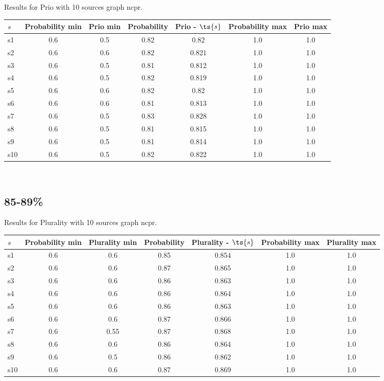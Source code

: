 \documentclass{article}
\begin{document}
\noindent Results for Prio with 10 sources graph ncpr.

\noindent\begin{tabular}{|l|c|c|c|c|c|c|}
\hline
$s$& Probability min & Prio min & Probability & Prio - $\ts{s}$ & Probability max & Prio max\\
\hline
s1 &0.6 & 0.5 & 0.82 & 0.82 & 1.0 & 1.0\\
\hline
s2 &0.6 & 0.6 & 0.82 & 0.821 & 1.0 & 1.0\\
\hline
s3 &0.6 & 0.5 & 0.81 & 0.812 & 1.0 & 1.0\\
\hline
s4 &0.6 & 0.5 & 0.82 & 0.819 & 1.0 & 1.0\\
\hline
s5 &0.6 & 0.6 & 0.82 & 0.82 & 1.0 & 1.0\\
\hline
s6 &0.6 & 0.6 & 0.81 & 0.813 & 1.0 & 1.0\\
\hline
s7 &0.6 & 0.5 & 0.83 & 0.828 & 1.0 & 1.0\\
\hline
s8 &0.6 & 0.5 & 0.81 & 0.815 & 1.0 & 1.0\\
\hline
s9 &0.6 & 0.5 & 0.81 & 0.814 & 1.0 & 1.0\\
\hline
s10 &0.6 & 0.5 & 0.82 & 0.822 & 1.0 & 1.0\\
\hline
\end{tabular}\\

\newpage

\subsection{85-89\%}

\noindent Results for Plurality with 10 sources graph ncpr.

\noindent\begin{tabular}{|l|c|c|c|c|c|c|}
\hline
$s$& Probability min & Plurality min & Probability & Plurality - $\ts{s}$ & Probability max & Plurality max\\
\hline
s1 &0.6 & 0.6 & 0.85 & 0.854 & 1.0 & 1.0\\
\hline
s2 &0.6 & 0.6 & 0.87 & 0.865 & 1.0 & 1.0\\
\hline
s3 &0.6 & 0.6 & 0.86 & 0.863 & 1.0 & 1.0\\
\hline
s4 &0.6 & 0.6 & 0.86 & 0.864 & 1.0 & 1.0\\
\hline
s5 &0.6 & 0.6 & 0.86 & 0.863 & 1.0 & 1.0\\
\hline
s6 &0.6 & 0.6 & 0.87 & 0.866 & 1.0 & 1.0\\
\hline
s7 &0.6 & 0.55 & 0.87 & 0.868 & 1.0 & 1.0\\
\hline
s8 &0.6 & 0.6 & 0.86 & 0.864 & 1.0 & 1.0\\
\hline
s9 &0.6 & 0.5 & 0.86 & 0.862 & 1.0 & 1.0\\
\hline
s10 &0.6 & 0.6 & 0.87 & 0.869 & 1.0 & 1.0\\
\hline
\end{tabular}\\
\end{document}
